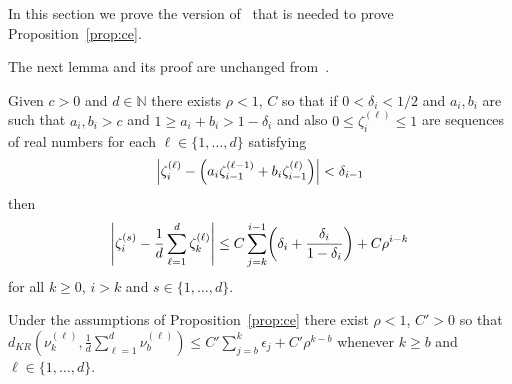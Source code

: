 \documentclass[AHL,Unicode,longabstracts,published]{cedram}
\newcommand{\N}{\mathbb{N}}
\let\originalleft\left
\let\originalright\right
\renewcommand{\left}{\mathopen{}\mathclose\bgroup\originalleft}
\renewcommand{\right}{\aftergroup\egroup\originalright}
\begin{document}
In this section we prove the version of~\cite[Corollary~3.3]{MR4269425} that is needed to prove Proposition~\ref{prop:ce}.

The next lemma and its proof are unchanged from~\cite[Lemma~3.2]{MR4269425}.
\begin{lemm}\label{lemma:to:bary}
Given $c>0$ and $d \in \N$ there exists $\rho<1$, $C$ so that if $0 < \delta_i <1/2$ and $a_i, b_i$ are such that $a_i,b_i>c$ and $1\geq a_i+b_i>1-\delta_i$ and also $0 \le \zeta_i^{(\ell)}\le 1$ are sequences of real numbers for each $\ell \in \{1,\dots,d\}$ satisfying
\begin{equation}\label{eq:gammas:assumption}
\left|\zeta_i^{(\ell)}-\left(a_i\zeta_{i-1}^{(\ell-1)}+b_i\zeta_{i-1}^{(\ell)}\right)\right|<\delta_{i-1}
\end{equation}
then
\[
\left|\zeta_i^{(s)}-\frac 1 d \sum_{\ell=1}^d\zeta_k^{(\ell)}\right|\leq
C\sum_{j=k}^{i-1}\left(\delta_i+\frac{\delta_i}{1-\delta_i}\right)+C\rho^{i-k}
\]
for
all $k \ge 0$, $i>k$ and $s \in \{1,\dots,d\}$.
\end{lemm}

\begin{coro}\label{cor:to:bary}
Under the assumptions of Proposition~\ref{prop:ce} there exist $ \rho<1$, $C'>0$ so that $d_{KR}(\nu_k^{(\ell)},\frac 1 d\sum_{\ell=1}^d \nu_{b}^{(\ell)})\leq C'\sum_{j=b}^k\epsilon_j +C'\rho^{k-b}$ whenever $k\geq b$ and $\ell\in \{1,\dots,d\}$.
\end{coro}
\end{document}
